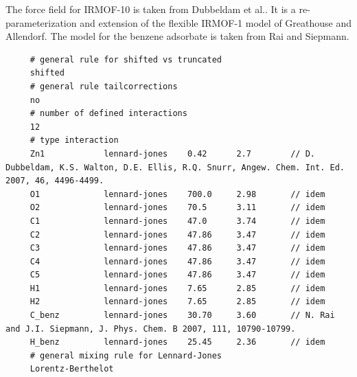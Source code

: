\noindent
The force field for IRMOF-10 is taken from Dubbeldam et al.\cite{Dubbeldam2007}. It is a re-parameterization and extension of the flexible IRMOF-1
model of Greathouse and Allendorf\cite{Greathouse2008}.
The model for the benzene adsorbate is taken from Rai and Siepmann\cite{Rai2007}.
\begin{tiny}
\begin{verbatim}
     # general rule for shifted vs truncated
     shifted
     # general rule tailcorrections
     no
     # number of defined interactions
     12
     # type interaction
     Zn1            lennard-jones    0.42      2.7        // D. Dubbeldam, K.S. Walton, D.E. Ellis, R.Q. Snurr, Angew. Chem. Int. Ed. 2007, 46, 4496-4499.
     O1             lennard-jones    700.0     2.98       // idem
     O2             lennard-jones    70.5      3.11       // idem
     C1             lennard-jones    47.0      3.74       // idem
     C2             lennard-jones    47.86     3.47       // idem
     C3             lennard-jones    47.86     3.47       // idem
     C4             lennard-jones    47.86     3.47       // idem
     C5             lennard-jones    47.86     3.47       // idem
     H1             lennard-jones    7.65      2.85       // idem
     H2             lennard-jones    7.65      2.85       // idem
     C_benz         lennard-jones    30.70     3.60       // N. Rai and J.I. Siepmann, J. Phys. Chem. B 2007, 111, 10790-10799.
     H_benz         lennard-jones    25.45     2.36       // idem
     # general mixing rule for Lennard-Jones
     Lorentz-Berthelot
\end{verbatim}
\end{tiny}

